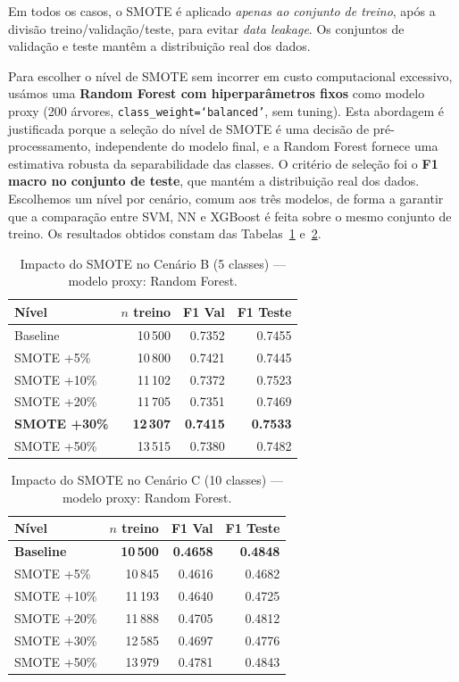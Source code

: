\documentclass[12pt,a4paper]{article}
\begin{document}
Em todos os casos, o SMOTE é aplicado \textit{apenas ao conjunto de treino}, após
a divisão treino/validação/teste, para evitar \textit{data leakage}. Os conjuntos de
validação e teste mantêm a distribuição real dos dados.

Para escolher o nível de SMOTE sem incorrer em custo computacional excessivo,
usámos uma \textbf{Random Forest com hiperparâmetros fixos} como modelo proxy
(200 árvores, \texttt{class\_weight=`balanced'}, sem tuning). Esta abordagem é
justificada porque a seleção do nível de SMOTE é uma decisão de pré-processamento,
independente do modelo final, e a Random Forest fornece uma estimativa robusta da
separabilidade das classes. O critério de seleção foi o \textbf{F1 macro no conjunto
de teste}, que mantém a distribuição real dos dados. Escolhemos um nível por cenário,
comum aos três modelos, de forma a garantir que a comparação entre SVM, NN e XGBoost
é feita sobre o mesmo conjunto de treino. Os resultados obtidos constam das
Tabelas~\ref{tab:smote_b} e~\ref{tab:smote_c}.

\begin{table}[H]
\centering
\caption{Impacto do SMOTE no Cenário B (5 classes) — modelo proxy: Random Forest.}
\label{tab:smote_b}
\begin{tabular}{lrrr}
\toprule
\textbf{Nível} & \textbf{$n$ treino} & \textbf{F1 Val} & \textbf{F1 Teste} \\
\midrule
Baseline      & 10\,500 & 0.7352 & 0.7455 \\
SMOTE +5\%    & 10\,800 & 0.7421 & 0.7445 \\
SMOTE +10\%   & 11\,102 & 0.7372 & 0.7523 \\
SMOTE +20\%   & 11\,705 & 0.7351 & 0.7469 \\
\textbf{SMOTE +30\%} & \textbf{12\,307} & \textbf{0.7415} & \textbf{0.7533} \\
SMOTE +50\%   & 13\,515 & 0.7380 & 0.7482 \\
\bottomrule
\end{tabular}
\end{table}

\begin{table}[H]
\centering
\caption{Impacto do SMOTE no Cenário C (10 classes) — modelo proxy: Random Forest.}
\label{tab:smote_c}
\begin{tabular}{lrrr}
\toprule
\textbf{Nível} & \textbf{$n$ treino} & \textbf{F1 Val} & \textbf{F1 Teste} \\
\midrule
\textbf{Baseline} & \textbf{10\,500} & \textbf{0.4658} & \textbf{0.4848} \\
SMOTE +5\%    & 10\,845 & 0.4616 & 0.4682 \\
SMOTE +10\%   & 11\,193 & 0.4640 & 0.4725 \\
SMOTE +20\%   & 11\,888 & 0.4705 & 0.4812 \\
SMOTE +30\%   & 12\,585 & 0.4697 & 0.4776 \\
SMOTE +50\%   & 13\,979 & 0.4781 & 0.4843 \\
\bottomrule
\end{tabular}
\end{table}
\end{document}

